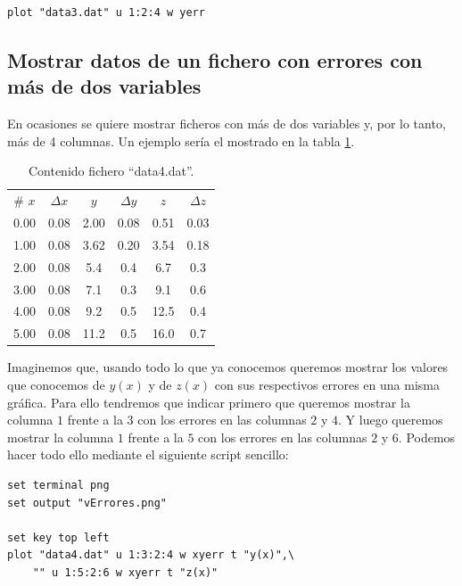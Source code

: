 \documentclass[11pt,a4paper,twoside,pdf]{article}
\numberwithin{equation}{section}
\begin{document}
\begin{lstlisting}[language=Gnuplot]
plot "data3.dat" u 1:2:4 w yerr
\end{lstlisting}

\subsection{Mostrar datos de un fichero con errores con más de dos variables}

En ocasiones se quiere mostrar ficheros con más de dos variables y, por lo tanto, más de 4 columnas. Un ejemplo sería el mostrado en la tabla \ref{tab:data_plot_errores_variascol}.

\begin{table}[h]
    \centering
    \caption{Contenido fichero ``data4.dat''.}
    \vspace{10pt}
    \label{tab:data_plot_errores_variascol}
    \begin{tabular}{cccccc}
        \# $x$ & $\Delta x$ & $y$ & $\Delta y$ & $z$ & $\Delta z$ \\
        0.00 & 0.08 & 2.00 & 0.08 & 0.51 & 0.03 \\
        1.00 & 0.08 & 3.62 & 0.20 & 3.54 & 0.18 \\
        2.00 & 0.08 & 5.4 & 0.4 & 6.7 & 0.3 \\
        3.00 & 0.08 & 7.1 & 0.3 & 9.1 & 0.6 \\
        4.00 & 0.08 & 9.2 & 0.5 & 12.5 & 0.4 \\
        5.00 & 0.08 & 11.2 & 0.5 & 16.0 & 0.7 \\
    \end{tabular}
\end{table}

Imaginemos que, usando todo lo que ya conocemos queremos mostrar los valores que conocemos de $y(x)$ y de $z(x)$ con sus respectivos errores en una misma gráfica. Para ello tendremos que indicar primero que queremos mostrar la columna $1$ frente a la $3$ con los errores en las columnas $2$ y $4$. Y luego queremos mostrar la columna $1$ frente a la $5$ con los errores en las columnas $2$ y $6$. Podemos hacer todo ello mediante el siguiente script sencillo:

\begin{lstlisting}[language=Gnuplot]
set terminal png
set output "vErrores.png"

set key top left
plot "data4.dat" u 1:3:2:4 w xyerr t "y(x)",\
    "" u 1:5:2:6 w xyerr t "z(x)"
\end{lstlisting}
\end{document}
